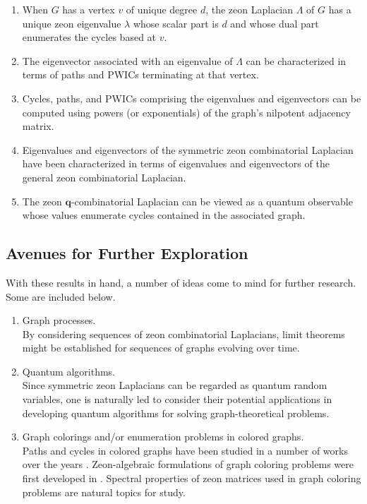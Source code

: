 \documentclass{article}
\theoremstyle{definition}
\newcommand{\q}{\mathbf{q}}
\numberwithin{equation}{section}
\begin{document}
\begin{enumerate}
\item When $G$ has a vertex $v$ of unique degree $d$, the zeon Laplacian $\Lambda$ of $G$ has a unique zeon eigenvalue $\lambda$ whose scalar part is $d$ and whose dual part enumerates the cycles based at $v$.
\item The eigenvector associated with an eigenvalue of $\Lambda$ can be characterized in terms of paths and PWICs terminating at that vertex.
\item Cycles, paths, and PWICs comprising the eigenvalues and eigenvectors can be computed using powers (or exponentials) of the graph's nilpotent adjacency matrix.
\item Eigenvalues and eigenvectors of the symmetric zeon combinatorial Laplacian have been characterized in terms of eigenvalues and eigenvectors of the general zeon combinatorial Laplacian.
\item The zeon $\q$-combinatorial Laplacian can be viewed as a quantum observable whose values enumerate cycles contained in the associated graph. 
\end{enumerate}
\vskip10pt


\subsection{Avenues for Further Exploration}

With these results in hand, a number of ideas come to mind for further research.   Some are included below.  

\begin{enumerate}

\item Graph processes.\\
By considering sequences of zeon combinatorial Laplacians, limit theorems might be established for sequences of graphs evolving over time.
 
\item Quantum algorithms.\\
Since symmetric zeon Laplacians can be regarded as quantum random variables, one is naturally led to consider their potential applications in developing quantum algorithms for solving graph-theoretical problems.

\item Graph colorings and/or enumeration problems in colored graphs.\\
Paths and cycles in colored graphs have been studied in a number of works over the years  \cite{albert,broersma05,frieze,wong}.  Zeon-algebraic formulations of graph coloring problems were first developed in \cite{StaplesStellhorn2017}.  Spectral properties of zeon matrices used in graph coloring problems are natural topics for study.

\end{enumerate}
\end{document}
